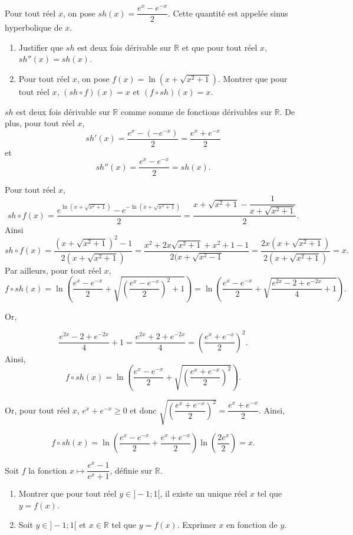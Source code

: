 \documentclass[11pt,fleqn, openany]{book} %
\begin{document}
\begin{exercise}
Pour tout réel $x$, on pose $sh(x)=\dfrac{e^x-e^{-x}}{2}$. Cette quantité est appelée sinus hyperbolique de $x$.

\begin{enumerate}
\item Justifier que $sh$ est deux fois dérivable sur $\mathbb{R}$ et que pour tout réel $x$, $sh''(x)=sh(x)$.

\item Pour tout réel $x$, on pose $f(x)=\ln(x+\sqrt{x^2+1})$.  Montrer que pour tout réel $x$, $(sh\circ f) (x)=x$ et $(f \circ sh) (x) = x$.

\end{enumerate}\end{exercise}

\begin{solution}$sh$ est deux fois dérivable sur $\mathbb{R}$ comme somme de fonctions dérivables sur $\mathbb{R}$. De plus, pour tout réel $x$,
\[sh'(x)=\dfrac{e^x-(-e^{-x})}{2}=\dfrac{e^x+e^{-x}}{2}\]
et
\[sh''(x)=\dfrac{e^x-e^{-x}}{2}=sh(x).\]

Pour tout  réel $x$, 
\[sh\circ f (x)=\dfrac{e^{\ln(x+\sqrt{x^2+1})}-e^{-\ln(x+\sqrt{x^2+1})}}{2}=\dfrac{x+\sqrt{x^2+1}-\dfrac{1}{x+\sqrt{x^2+1}}}{2}.\]
Ainsi
\[ sh\circ f (x)= \dfrac{(x+\sqrt{x^2+1})^2-1}{2(x+\sqrt{x^2+1})}=\dfrac{x^2+2x\sqrt{x^2+1}+x^2+1-1}{2(x+\sqrt{x^2-1}}=\dfrac{2x(x+\sqrt{x^2+1})}{2(x+\sqrt{x^2+1})}=x.\]
Par ailleurs, pour tout réel $x$,
\[ f \circ sh(x)= \ln\left( \dfrac{e^x-e^{-x}}{2}+\sqrt{\left(\dfrac{e^x-e^{-x}}{2}\right)^2+1}\right)=\ln\left( \dfrac{e^x-e^{-x}}{2}+\sqrt{\dfrac{e^{2x}-2+e^{-2x}}{4}+1}\right).\]

Or, 

\[\dfrac{e^{2x}-2+e^{-2x}}{4}+1=\dfrac{e^{2x}+2+e^{-2x}}{4}=\left(\dfrac{e^x+e^{-x}}{2}\right)^2.\]
Ainsi, 
\[f \circ sh(x) = \ln\left( \dfrac{e^x-e^{-x}}{2}+\sqrt{\left(\dfrac{e^x+e^{-x}}{2}\right)^2}\right).\]

Or, pour tout réel $x$, $e^x+e^{-x}\geqslant 0$ et donc $\sqrt{\left(\dfrac{e^x+e^{-x}}{2}\right)^2}=\dfrac{e^x+e^{-x}}{2}$. Ainsi, 

\[f \circ sh(x)=\ln\left( \dfrac{e^x-e^{-x}}{2}+\dfrac{e^x+e^{-x}}{2}\right)\ln\left(\dfrac{2e^x}{2}\right)=x.\]\end{solution}





\begin{exercise}Soit $f$ la fonction $x\mapsto \dfrac{e^x-1}{e^x+1}$, définie sur $\mathbb{R}$.
\begin{enumerate}
\item Montrer que pour tout réel $y \in ]-1;1[$, il existe un unique réel $x$ tel que $y=f(x)$.
\item Soit $y\in ]-1;1[$ et $x\in\mathbb{R}$ tel que $y=f(x)$. Exprimer $x$ en fonction de $y$.
\end{enumerate}\end{exercise}
\end{document}
